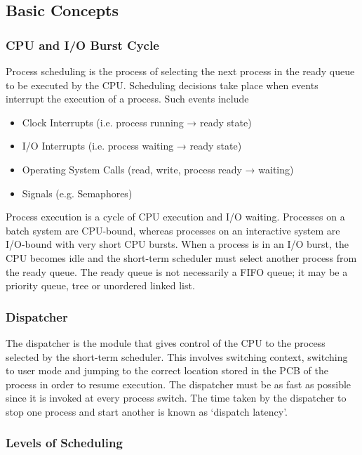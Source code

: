 \subsection{Basic Concepts}

\subsubsection{CPU and I/O Burst Cycle}

Process scheduling is the process of selecting the next process in the ready queue to be executed by the CPU\@.
Scheduling decisions take place when events interrupt the execution of a process.
Such events include 
\begin{itemize}
  \item Clock Interrupts (i.e. process running → ready state)
  \item I/O Interrupts (i.e. process waiting → ready state)
  \item Operating System Calls (read, write, process ready → waiting)
  \item Signals (e.g. Semaphores)
\end{itemize}

Process execution is a cycle of CPU execution and I/O waiting.
Processes on a batch system are CPU-bound, whereas processes on an interactive system are I/O-bound with very short CPU bursts.
When a process is in an I/O burst, the CPU becomes idle and the short-term scheduler must select another process from the ready queue.
The ready queue is not necessarily a FIFO queue; it may be a priority queue, tree or unordered linked list.

\subsubsection{Dispatcher}

The dispatcher is the module that gives control of the CPU to the process selected by the short-term scheduler.
This involves switching context, switching to user mode and jumping to the correct location stored in the PCB of the process in order to resume execution.
The dispatcher must be as fast as possible since it is invoked at every process switch.
The time taken by the dispatcher to stop one process and start another is known as `dispatch latency'.

\subsubsection{Levels of Scheduling}

